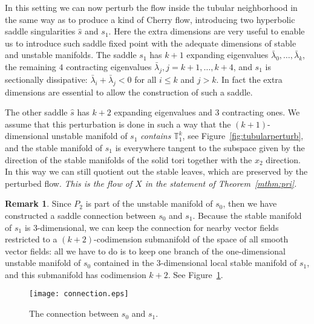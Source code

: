 \documentclass[reqno,12pt,a4paper]{amsart}
\theoremstyle{plain}
\theoremstyle{definition}
\newtheorem{remark}[theorem]{Remark}
\begin{document}
In this setting we can now perturb the flow inside the
tubular neighborhood in the same way as to produce a kind of
Cherry flow, introducing two hyperbolic saddle singularities
$\hat s$ and $s_1$. Here the extra dimensions are very
useful to enable us to introduce such saddle fixed point
with the adequate dimensions of stable and unstable
manifolds.  The saddle $s_1$ has $k+1$ expanding eigenvalues
$\bar\lambda_0,\dots,\bar\lambda_{k}$, the remaining $4$
contracting eigenvalues $\bar\lambda_j, j=k+1,\dots,k+4$,
and $s_1$ is sectionally dissipative:
$\bar\lambda_i+\bar\lambda_j<0$ for all $i\le k$ and $j>k$.
In fact the extra dimensions are essential to allow the
construction of such a saddle.

The other saddle $\hat s$ has $k+2$ expanding eigenvalues
and $3$ contracting ones.  We assume that this perturbation
is done in such a way that the $(k+1)$-dimensional unstable
manifold of $s_1$ \emph{contains} ${{\mathbb T}}^k_1$, see
Figure~\ref{fig:tubularperturb}, and the stable manifold of
$s_1$ is everywhere tangent to the subspace given by the
direction of the stable manifolds of the solid tori together
with the $x_2$ direction. In this way we can still quotient
out the stable leaves, which are preserved by the perturbed
flow. \emph{This is the flow of $X$ in the statement of
Theorem~\ref{mthm:pri}.}

\begin{remark}\label{rmk:keepsaddleconnection}
  Since $P_2$ is part of the unstable manifold of $s_0$,
  then we have constructed a saddle connection between $s_0$
  and $s_1$. Because the stable manifold of $s_1$ is
  $3$-dimensional, we can keep the connection for nearby
  vector fields restricted to a $(k+2)$-codimension 
  submanifold of the space of all smooth vector fields: all
  we have to do is to keep one branch of the one-dimensional
  unstable manifold of $s_0$ contained in the
  $3$-dimensional local stable manifold of $s_1$, and this
  submanifold has codimension $k+2$. See
  Figure~\ref{fig:saddle-connection}.
\end{remark}

\begin{figure}[htbp]
\begin{center}
  \texttt{[image: connection.eps]}
\end{center}
\caption{The connection between $s_0$ and $s_1$.}
  \label{fig:saddle-connection}
\end{figure}
\end{document}
